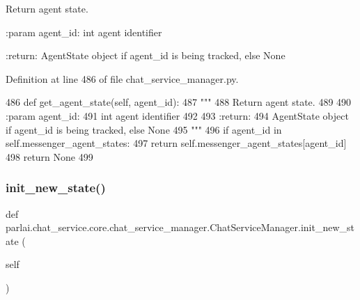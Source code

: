\begin{DoxyVerb}Return agent state.

:param agent_id:
    int agent identifier

:return:
    AgentState object if agent_id is being tracked, else None
\end{DoxyVerb}
 

Definition at line 486 of file chat\+\_\+service\+\_\+manager.\+py.


\begin{DoxyCode}
486     \textcolor{keyword}{def }get\_agent\_state(self, agent\_id):
487         \textcolor{stringliteral}{"""}
488 \textcolor{stringliteral}{        Return agent state.}
489 \textcolor{stringliteral}{}
490 \textcolor{stringliteral}{        :param agent\_id:}
491 \textcolor{stringliteral}{            int agent identifier}
492 \textcolor{stringliteral}{}
493 \textcolor{stringliteral}{        :return:}
494 \textcolor{stringliteral}{            AgentState object if agent\_id is being tracked, else None}
495 \textcolor{stringliteral}{        """}
496         \textcolor{keywordflow}{if} agent\_id \textcolor{keywordflow}{in} self.messenger\_agent\_states:
497             \textcolor{keywordflow}{return} self.messenger\_agent\_states[agent\_id]
498         \textcolor{keywordflow}{return} \textcolor{keywordtype}{None}
499 
\end{DoxyCode}
\mbox{\label{classparlai_1_1chat__service_1_1core_1_1chat__service__manager_1_1ChatServiceManager_a4aa33c8155ac0850476037f8809c8f22}} 
\subsubsection{\texorpdfstring{init\+\_\+new\+\_\+state()}{init\_new\_state()}}
{\footnotesize\ttfamily def parlai.\+chat\+\_\+service.\+core.\+chat\+\_\+service\+\_\+manager.\+Chat\+Service\+Manager.\+init\+\_\+new\+\_\+state (\begin{DoxyParamCaption}\item[{}]{self }\end{DoxyParamCaption})}

